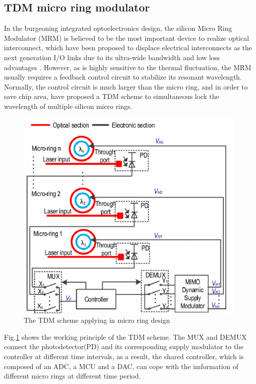 \documentclass[draftcls, journal]{IEEEtran}
\begin{document}
\subsection{TDM micro ring modulator}
In the burgeoning integrated optoelectronics design, the silicon Micro Ring Modulator (MRM) is believed to be the most important device to realize optical interconnect, which have been proposed to displace electrical interconnects as the next generation I/O links due to its ultra-wide bandwidth and low loss advantages \cite{wangzhicheng}. However, as is highly sensitive to the thermal fluctuation, the MRM usually requires a feedback control circuit to stabilize its resonant wavelength. Normally, the control circuit is much larger than the micro ring, and in order to save chip area, \cite{wangzhicheng} have proposed a TDM scheme to simultaneous lock the wavelength of multiple silicon micro rings.
\begin{figure}[t!]
    \centering
    \includegraphics[width=\linewidth]{pic/TDM/MRM.pdf}
    \caption{The TDM scheme applying in micro ring design}
    \label{fig:MRM}
\end{figure}

Fig.\ref{fig:MRM} shows the working principle of the TDM scheme. The MUX and DEMUX connect the photodetector(PD) and its corresponding supply modulator to the controller at different time intervals, as a result, the shared controller, which is composed of an ADC, a MCU and a DAC, can cope with the imformation of different micro rings at different time period.
\end{document}
